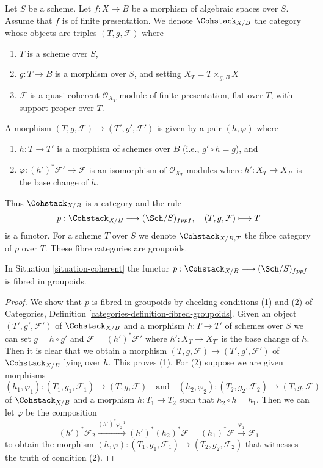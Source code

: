 \begin{situation}
\label{situation-coherent}
Let $S$ be a scheme. Let $f : X \to B$ be a morphism of algebraic spaces
over $S$. Assume that $f$ is of finite presentation.
We denote $\Cohstack_{X/B}$ the category whose objects are
triples $(T, g, \mathcal{F})$ where
\begin{enumerate}
\item $T$ is a scheme over $S$,
\item $g : T \to B$ is a morphism over $S$, and setting
$X_T = T \times_{g, B} X$
\item $\mathcal{F}$ is a quasi-coherent $\mathcal{O}_{X_T}$-module
of finite presentation, flat over $T$, with support proper over $T$.
\end{enumerate}
A morphism $(T, g, \mathcal{F}) \to (T', g', \mathcal{F}')$
is given by a pair $(h, \varphi)$ where
\begin{enumerate}
\item $h : T \to T'$ is a morphism of schemes over $B$
(i.e., $g' \circ h = g$), and
\item $\varphi : (h')^*\mathcal{F}' \to \mathcal{F}$ is an
isomorphism of $\mathcal{O}_{X_T}$-modules where $h' : X_T \to X_{T'}$
is the base change of $h$.
\end{enumerate}
\end{situation}

\noindent
Thus $\Cohstack_{X/B}$ is a category and the rule
$$
p : \Cohstack_{X/B} \longrightarrow (\Sch/S)_{fppf},
\quad
(T, g, \mathcal{F}) \longmapsto T
$$
is a functor. For a scheme $T$ over $S$ we denote $\Cohstack_{X/B, T}$
the fibre category of $p$ over $T$. These fibre categories are groupoids.

\begin{lemma}
\label{lemma-coherent-fibred-in-groupoids}
In Situation \ref{situation-coherent} the functor
$p : \Cohstack_{X/B} \longrightarrow (\Sch/S)_{fppf}$
is fibred in groupoids.
\end{lemma}

\begin{proof}
We show that $p$ is fibred in groupoids by checking conditions
(1) and (2) of Categories, Definition
\ref{categories-definition-fibred-groupoids}.
Given an object $(T', g', \mathcal{F}')$
of $\Cohstack_{X/B}$ and a morphism $h : T \to T'$ of
schemes over $S$ we can set $g = h \circ g'$ and
$\mathcal{F} = (h')^*\mathcal{F}'$ where $h' : X_T \to X_{T'}$
is the base change of $h$. Then it is clear that we obtain
a morphism $(T, g, \mathcal{F}) \to (T', g', \mathcal{F}')$
of $\Cohstack_{X/B}$ lying over $h$. This proves (1).
For (2) suppose we are given morphisms
$$
(h_1, \varphi_1) : (T_1, g_1, \mathcal{F}_1) \to (T, g, \mathcal{F})
\quad\text{and}\quad
(h_2, \varphi_2) : (T_2, g_2, \mathcal{F}_2) \to (T, g, \mathcal{F})
$$
of $\Cohstack_{X/B}$ and a morphism $h : T_1 \to T_2$ such that
$h_2 \circ h = h_1$. Then we can let $\varphi$ be the composition
$$
(h')^*\mathcal{F}_2
\xrightarrow{(h')^*\varphi_2^{-1}}
(h')^*(h_2)^*\mathcal{F} = (h_1)^*\mathcal{F}
\xrightarrow{\varphi_1}
\mathcal{F}_1
$$
to obtain the morphism
$(h, \varphi) : (T_1, g_1, \mathcal{F}_1) \to (T_2, g_2, \mathcal{F}_2)$
that witnesses the truth of condition (2).
\end{proof}

